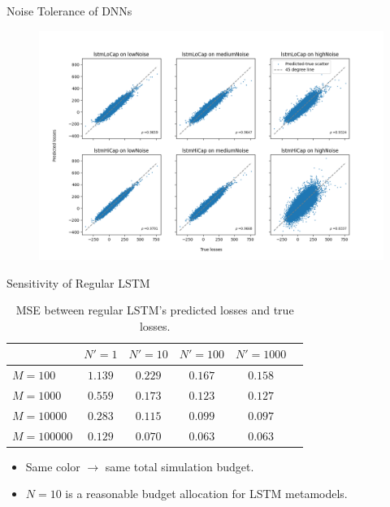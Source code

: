 \documentclass[9pt,handout]{beamer}
\begin{document}
\begin{frame}{Noise Tolerance of DNNs}

    \begin{figure}[ht!]
        \centering
        \includegraphics[width=\textwidth]{../project2/figures/qqPlots/lstmAll.png}
    \end{figure}

\end{frame}

\begin{frame}{Sensitivity of Regular LSTM}

    \begin{table}[ht!]
        \centering
        \begin{tabular}{lccccc}
            \toprule
                           & $N'=1$   & $N'=10$  & $N'=100$ & $N'=1000$\\
            \midrule
            $M = 100$      & \textcolor{color10_2}{$1.139$} & \textcolor{color10_3}{$0.229$} & \textcolor{color10_4}{$0.167$} & \textcolor{color10_5}{$0.158$} \\
            $M = 1000$     & \textcolor{color10_3}{$0.559$} & \textcolor{color10_4}{$0.173$} & \textcolor{color10_5}{$0.123$} & \textcolor{color10_6}{$0.127$} \\
            $M = 10000$    & \textcolor{color10_4}{$0.283$} & \textcolor{color10_5}{$0.115$} & \textcolor{color10_6}{$0.099$} & \textcolor{color10_7}{$0.097$} \\
            $M = 100000$   & \textcolor{color10_5}{$0.129$} & \textcolor{color10_6}{$0.070$} & \textcolor{color10_7}{$0.063$} & \textcolor{color10_8}{$0.063$} \\
            \bottomrule
        \end{tabular}
        \caption{MSE between regular LSTM's predicted losses and true losses.}
    \end{table}

    \begin{itemize}
        \item   Same color $\rightarrow$ same total simulation budget.
        \item   $N = 10$ is a reasonable budget allocation for LSTM metamodels.
    \end{itemize}
    
\end{frame}
\end{document}
